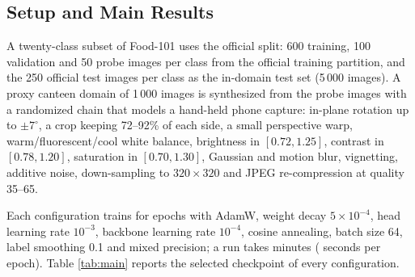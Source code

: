 \documentclass[conference]{IEEEtran}
\begin{document}
\subsection{Setup and Main Results}
A twenty-class subset of Food-101 \cite{bossard2014food101} uses the official
split: 600 training, 100 validation and 50 probe images per class from the
official training partition, and the 250 official test images per class as the
in-domain test set (5\,000 images). A proxy canteen domain of 1\,000 images is
synthesized from the probe images with a randomized chain that models a hand-held
phone capture: in-plane rotation up to $\pm7^\circ$, a crop keeping 72--92\% of
each side, a small perspective warp, warm/fluorescent/cool white balance,
brightness in $[0.72,1.25]$, contrast in $[0.78,1.20]$, saturation in
$[0.70,1.30]$, Gaussian and motion blur, vignetting, additive noise,
down-sampling to $320\times320$ and JPEG re-compression at quality 35--65.

Each configuration trains for \epochsFour{} epochs with AdamW, weight decay
$5\times10^{-4}$, head learning rate $10^{-3}$, backbone learning rate
$10^{-4}$, cosine annealing, batch size 64, label smoothing 0.1 and mixed
precision; a run takes \trainTimeFour{} minutes (\epochSecFour{} seconds per
epoch). Table \ref{tab:main} reports the selected checkpoint of every
configuration.
\end{document}
